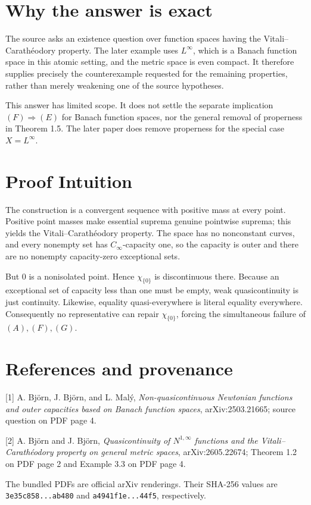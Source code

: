 \documentclass[11pt]{article}
\newcommand{\Cinf}{C_\infty}
\begin{document}
\section*{Why the answer is exact}

The source asks an existence question over function spaces having the
Vitali--Carath\'eodory property.  The later example uses $L^\infty$, which is
a Banach function space in this atomic setting, and the metric space is even
compact.  It therefore supplies precisely the counterexample requested for
the remaining properties, rather than merely weakening one of the source
hypotheses.

This answer has limited scope.  It does not settle the separate implication
$(F)\Rightarrow(E)$ for Banach function spaces, nor the general removal of
properness in Theorem 1.5.  The later paper does remove properness for the
special case $X=L^\infty$.

\section*{Proof Intuition}

The construction is a convergent sequence with positive mass at every
point.  Positive point masses make essential suprema genuine pointwise
suprema; this yields the Vitali--Carath\'eodory property.  The space has no
nonconstant curves, and every nonempty set has $\Cinf$-capacity one, so the
capacity is outer and there are no nonempty capacity-zero exceptional sets.

But $0$ is a nonisolated point.  Hence $\chi_{\{0\}}$ is discontinuous there.
Because an exceptional set of capacity less than one must be empty, weak
quasicontinuity is just continuity.  Likewise, equality quasi-everywhere is
literal equality everywhere.  Consequently no representative can repair
$\chi_{\{0\}}$, forcing the simultaneous failure of $(A),(F),(G)$.

\section*{References and provenance}

[1] A. Bj\"orn, J. Bj\"orn, and L. Mal\'y, \emph{Non-quasicontinuous
Newtonian functions and outer capacities based on Banach function spaces},
arXiv:2503.21665; source question on PDF page 4.

[2] A. Bj\"orn and J. Bj\"orn, \emph{Quasicontinuity of $N^{1,\infty}$
functions and the Vitali--Carath\'eodory property on general metric spaces},
arXiv:2605.22674; Theorem 1.2 on PDF page 2 and Example 3.3 on PDF page 4.

The bundled PDFs are official arXiv renderings.  Their SHA-256 values are
\texttt{3e35c858...ab480} and \texttt{a4941f1e...44f5}, respectively.
\end{document}

